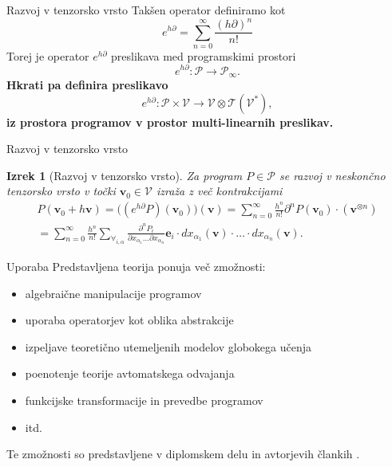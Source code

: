\documentclass{beamer}
\newcommand{\T}{\mathcal{T}}
\newcommand{\VV}{\mathcal{V}}
\newcommand{\e}{\mathbf{e}}
\newcommand{\vv}{\mathbf{v}}
\newcommand{\dP}{\mathcal{P}}
\newcommand{\D}{\partial}
\newtheorem{izrek}{Izrek}[section]
\begin{document}
\begin{frame}{Razvoj v tenzorsko vrsto}
Takšen operator definiramo kot
\begin{equation*}
 	e^{h\D}=\sum\limits_{n=0}^{\infty}\frac{(h\D)^n}{n!}
 \end{equation*}
 Torej je operator $e^{h\D}$ preslikava med programskimi prostori
  \begin{equation*}
  	e^{h\D}:\dP\to\dP_\infty.
  \end{equation*}
 \textbf{Hkrati pa definira preslikavo}
   \begin{equation*}\label{eq:specProg}
   	e^{h\D}:\dP\times \VV\to \VV\otimes \T(\VV^*),
   \end{equation*}
\textbf{iz prostora programov v prostor multi-linearnih preslikav.}
\end{frame}

\begin{frame}{Razvoj v tenzorsko vrsto}

\begin{izrek}[Razvoj v tenzorsko vrsto]\label{izr:e^d}
	Za program $P\in\dP$  se razvoj v neskončno tenzorsko vrsto
  v točki $\vv_0\in \VV$ izraža z več kontrakcijami 
	\begin{multline*}\label{eq:tenzorVrsta}
	P(\vv_0+h\vv) = \Big((e^{h\D}P)(\vv_0)\Big)(\vv)
  = \sum_{n=0}^\infty\frac{h^n}{n!}\D^nP(\vv_0)\cdot (\vv^{\otimes n})\\
  = \sum_{n=0}^\infty \frac{h^n}{n!}\sum_{\forall_{i,\alpha}}\frac{\partial^nP_i}{\partial
 		    x_{\alpha_1}\ldots \partial x_{\alpha_n}}\e_i\cdot
 		  dx_{\alpha_1}(\vv)\cdot\ldots \cdot dx_{\alpha_n}(\vv).
	\end{multline*}
\end{izrek}

\end{frame}

\begin{frame}{Uporaba}
Predstavljena teorija ponuja več zmožnosti: 
\begin{itemize}
\item
algebraične manipulacije programov
\item
uporaba operatorjev kot oblika abstrakcije
\item
izpeljave teoretično utemeljenih modelov globokega učenja
\item
poenotenje teorije avtomatskega odvajanja
\item
funkcijske transformacije in prevedbe programov
\item
itd.
\end{itemize}
Te zmožnosti so predstavljene v diplomskem delu in avtorjevih člankih \cite{opCalProg,dC++Paper}.
\end{frame}
\end{document}
